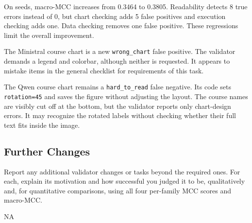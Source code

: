 \documentclass[11pt]{article}
\begin{document}
On seeds, macro-MCC increases from 0.3464 to 0.3805. Readability detects 8
true errors instead of 0, but chart checking adds 5 false positives and
execution checking adds one. Data checking removes one false positive. These
regressions limit the overall improvement.

The Ministral course chart is a new \texttt{wrong\_chart} false positive. The
validator demands a legend and colorbar, although neither is requested. It
appears to mistake items in the general checklist for requirements of this task.

The Qwen course chart remains a \texttt{hard\_to\_read} false negative. Its code
sets \verb|rotation=45| and saves the figure without adjusting the layout.
The course names are visibly cut off at the bottom, but the validator reports
only chart-design errors. It may recognize the rotated labels without checking
whether their full text fits inside the image.

\subsection{Further Changes}
Report any additional validator changes or tasks beyond the required ones.
For each, explain its motivation and how successful you judged it to be,
qualitatively and, for quantitative comparisons, using all four per-family MCC
scores and macro-MCC.

\medskip
NA
\end{document}
